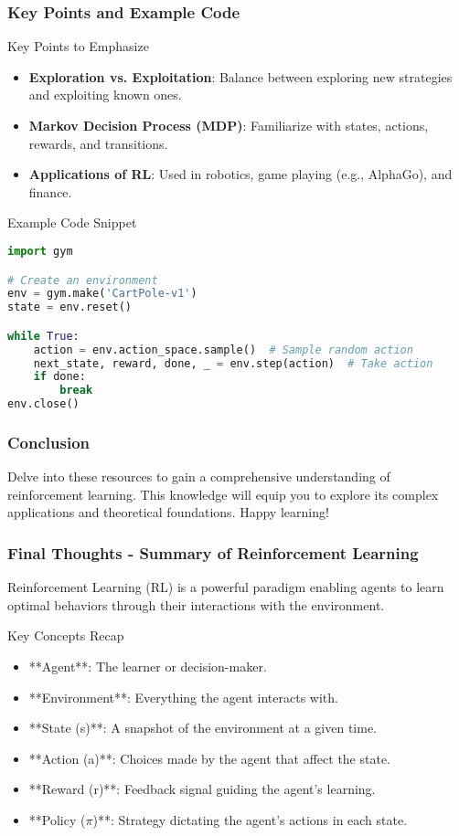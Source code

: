 \documentclass[aspectratio=169]{beamer}
\begin{document}
\begin{frame}[fragile]
    \frametitle{Key Points and Example Code}
    \begin{block}{Key Points to Emphasize}
        \begin{itemize}
            \item \textbf{Exploration vs. Exploitation}: Balance between exploring new strategies and exploiting known ones.
            \item \textbf{Markov Decision Process (MDP)}: Familiarize with states, actions, rewards, and transitions.
            \item \textbf{Applications of RL}: Used in robotics, game playing (e.g., AlphaGo), and finance.
        \end{itemize}
    \end{block}

    \begin{block}{Example Code Snippet}
    \begin{lstlisting}[language=Python]
import gym

# Create an environment
env = gym.make('CartPole-v1')
state = env.reset()

while True:
    action = env.action_space.sample()  # Sample random action
    next_state, reward, done, _ = env.step(action)  # Take action
    if done:
        break
env.close()
    \end{lstlisting}
    \end{block}
\end{frame}

\begin{frame}[fragile]
    \frametitle{Conclusion}
    Delve into these resources to gain a comprehensive understanding of reinforcement learning. This knowledge will equip you to explore its complex applications and theoretical foundations. Happy learning!
\end{frame}

\begin{frame}[fragile]
    \frametitle{Final Thoughts - Summary of Reinforcement Learning}
    Reinforcement Learning (RL) is a powerful paradigm enabling agents to learn optimal behaviors through their interactions with the environment.
    \begin{block}{Key Concepts Recap}
        \begin{itemize}
            \item **Agent**: The learner or decision-maker.
            \item **Environment**: Everything the agent interacts with.
            \item **State (s)**: A snapshot of the environment at a given time.
            \item **Action (a)**: Choices made by the agent that affect the state.
            \item **Reward (r)**: Feedback signal guiding the agent's learning.
            \item **Policy ($\pi$)**: Strategy dictating the agent's actions in each state.
        \end{itemize}
    \end{block}
\end{frame}
\end{document}

